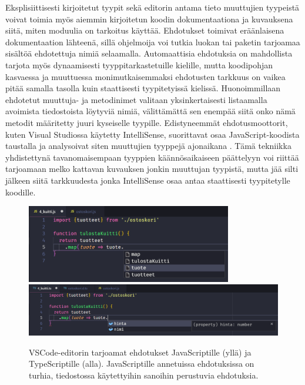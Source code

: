 Eksplisiittisesti kirjoitetut tyypit sekä editorin antama tieto muuttujien
tyypeistä voivat toimia myös aiemmin kirjoitetun koodin dokumentaationa ja
kuvauksena siitä, miten moduulia on tarkoitus käyttää.
Ehdotukset toimivat eräänlaisena dokumentaation lähteenä,
sillä ohjelmoija voi tutkia luokan tai
paketin tarjoamaa sisältöä ehdotettuja nimiä selaamalla. Automaattisia ehdotuksia
on mahdollista tarjota myös dynaamisesti tyyppitarkastetuille kielille, mutta
koodipohjan kasvaessa ja muuttuessa monimutkaisemmaksi ehdotusten tarkkuus
on vaikea pitää samalla tasolla kuin staattisesti tyypitetyissä kielissä.
Huonoimmillaan ehdotetut muuttuja- ja metodinimet valitaan yksinkertaisesti
listaamalla avoimista tiedostoista löytyviä nimiä, välittämättä sen
enempää siitä onko nämä metodit määritetty juuri kyseiselle tyypille.
Edistyneemmät ehdotusmoottorit, kuten Visual Studiossa käytetty IntelliSense,
suorittavat osaa JavaScript-koodista taustalla ja analysoivat siten muuttujien
tyyppejä ajonaikana \cite{PreviewingSalsa, JavaScriptIntellisense}.
Tämä tekniikka yhdistettynä tavanomaisempaan tyyppien
käännösaikaiseen päättelyyn voi riittää tarjoamaan melko kattavan kuvauksen
jonkin muuttujan tyypistä, mutta jää silti jälkeen siitä tarkkuudesta jonka
IntelliSense osaa antaa staattisesti tyypitetylle koodille.
\begin{figure}
\includegraphics[width=0.8\textwidth]{images/intellisense_javascript}
\includegraphics[width=\textwidth]{images/intellisense_typescript}
\noindent
\caption{
  VSCode-editorin tarjoamat ehdotukset JavaScriptille (yllä) ja TypeScriptille (alla).
  JavaScriptille annetuissa ehdotuksissa on turhia, tiedostossa käytettyihin
  sanoihin perustuvia ehdotuksia.}
\label{fig:Suggestions}
\end{figure}

